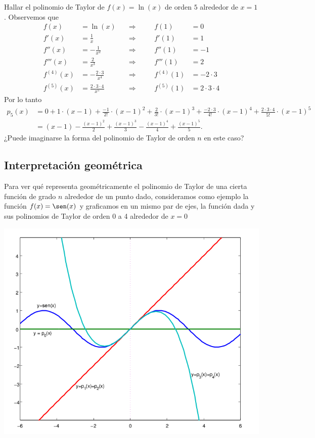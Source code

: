 \begin{example}
 Hallar el polinomio de Taylor de $f(x) = \ln (x)$ de orden $5$ alrededor de $x=1$. 
Observemos que
\[
\begin{aligned}
 f(x) &= \ln(x)  \quad &\Longrightarrow & &\quad f(1)  &= 0 \\
 f'(x) &= \frac{1}{x} \quad &\Longrightarrow& & \quad f'(1) &= 1 \\
 f''(x) &= -\frac{1}{x^2}\quad &\Longrightarrow& & \quad f''(1) &= -1 \\
 f'''(x) &= \frac{2}{x^3} \quad &\Longrightarrow& & \quad f'''(1) &= 2 \\
 f^{(4)}(x) &= -\frac{2\cdot 3}{x^4} \quad &\Longrightarrow& & \quad f^{(4)}(1) &= -2 \cdot 3 \\
 f^{(5)}(x) &= \frac{2\cdot 3 \cdot 4}{x^5} \quad &\Longrightarrow& & \quad f^{(5)}(1) &= 2 \cdot 3\cdot 4 
\end{aligned}
\]
Por lo tanto
\begin{align*}
p_5(x) &= 0 + 1 \cdot (x-1) + \frac{-1}{2!} \cdot (x-1)^2 + \frac{2}{3!} \cdot (x-1)^3 +
          \frac{-2 \cdot 3}{4!} \cdot (x-1)^4 + \frac{2\cdot 3\cdot 4}{5!} \cdot (x-1)^5\\
       &= (x-1) - \frac{(x-1)^2}{2} + \frac{(x-1)^3}{3} - \frac{(x-1)^4}{4} + \frac{(x-1)^5}{5}.
\end{align*}
¿Puede imaginarse la forma del polinomio de Taylor de orden $n$ en este caso?
\end{example}

\subsection{Interpretación geométrica}

Para ver qué representa geométricamente el polinomio de Taylor de una cierta función de grado $n$ alrededor de un punto dado, consideramos como ejemplo la función $f(x) = \sen(x)$ y graficamos en un mismo par de ejes, la función dada y sus polinomios de Taylor de orden 0 a 4 alrededor de $x=0$

\centerline{\includegraphics[width=.6\textwidth]{pics/taylor-seno-1.png}}


